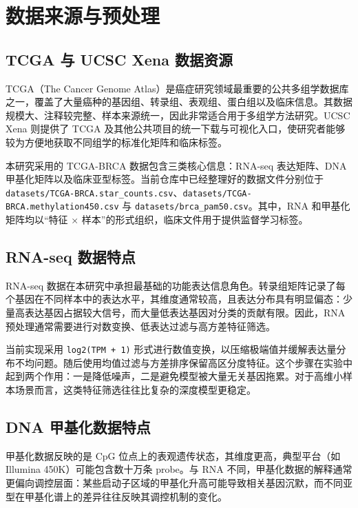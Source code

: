 \section{数据来源与预处理}

\subsection{TCGA 与 UCSC Xena 数据资源}

TCGA（The Cancer Genome Atlas）是癌症研究领域最重要的公共多组学数据库之一，覆盖了大量癌种的基因组、转录组、表观组、蛋白组以及临床信息。其数据规模大、注释较完整、样本来源统一，因此非常适合用于多组学方法研究。UCSC Xena 则提供了 TCGA 及其他公共项目的统一下载与可视化入口，使研究者能够较为方便地获取不同组学的标准化矩阵和临床标签。

本研究采用的 TCGA-BRCA 数据包含三类核心信息：RNA-seq 表达矩阵、DNA 甲基化矩阵以及临床亚型标签。当前仓库中已经整理好的数据文件分别位于 \texttt{datasets/TCGA-BRCA.star\_counts.csv}、\texttt{datasets/TCGA-BRCA.methylation450.csv} 与 \texttt{datasets/brca\_pam50.csv}。其中，RNA 和甲基化矩阵均以“特征 × 样本”的形式组织，临床文件用于提供监督学习标签。

\subsection{RNA-seq 数据特点}

RNA-seq 数据在本研究中承担最基础的功能表达信息角色。转录组矩阵记录了每个基因在不同样本中的表达水平，其维度通常较高，且表达分布具有明显偏态：少量高表达基因占据较大信号，而大量低表达基因对分类的贡献有限。因此，RNA 预处理通常需要进行对数变换、低表达过滤与高方差特征筛选。

当前实现采用 \texttt{log2(TPM + 1)} 形式进行数值变换，以压缩极端值并缓解表达量分布不均问题。随后使用均值过滤与方差排序保留高区分度特征。这个步骤在实验中起到两个作用：一是降低噪声，二是避免模型被大量无关基因拖累。对于高维小样本场景而言，这类特征筛选往往比复杂的深度模型更稳定。

\subsection{DNA 甲基化数据特点}

甲基化数据反映的是 CpG 位点上的表观遗传状态，其维度更高，典型平台（如 Illumina 450K）可能包含数十万条 probe。与 RNA 不同，甲基化数据的解释通常更偏向调控层面：某些启动子区域的甲基化升高可能导致相关基因沉默，而不同亚型在甲基化谱上的差异往往反映其调控机制的变化。

